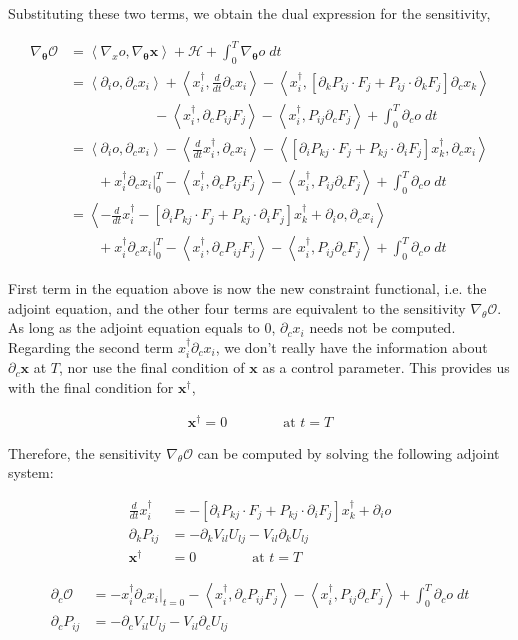 \documentclass[11pt]{article}
\def\Dnorm#1#2{ \frac{d #1 }{ d #2} }
\newcommand\eqsp[2]{
\begin{equation#1}
\begin{split}
#2
\end{split}
\end{equation#1}
}
\newcommand{\cH}{\mathcal{H}}
\newcommand{\cO}{\mathcal{O}}
\newcommand{\bx}{\mathbf{x}}
\newcommand{\bt}{\mathbf{\theta}}
\newcommand{\inprod}[2]{\left\langle #1,#2 \right\rangle}
\begin{document}
Substituting these two terms, we obtain the dual expression for the sensitivity,
\eqsp{*}{
\nabla_{\bt}\cO &= \inprod{\nabla_xo}{\nabla_{\bt}\bx} + \cH + \int_0^T \nabla_{\bt}o\;dt\\
&= \inprod{\partial_io}{\partial_cx_i}
+ \inprod{x_i^{\dagger}}{\Dnorm{}{t}\partial_cx_i}
- \inprod{x_i^{\dagger}}{\left[ \partial_kP_{ij}\cdot F_j + P_{ij}\cdot\partial_kF_j \right]\partial_cx_k}\\
&\qquad\qquad\qquad - \inprod{x_i^{\dagger}}{\partial_cP_{ij}F_j} - \inprod{x_i^{\dagger}}{P_{ij}\partial_cF_j} + \int_0^T \partial_co\;dt\\
&= \inprod{\partial_io}{\partial_cx_i}
- \inprod{\Dnorm{}{t}x_i^{\dagger}}{\partial_cx_i}
- \inprod{ \left[ \partial_iP_{kj}\cdot F_j + P_{kj}\cdot\partial_iF_j \right]x_k^{\dagger} }{ \partial_cx_i }\\
&\qquad +x_i^{\dagger}\partial_cx_i\bigg|_{0}^{T}
- \inprod{x_i^{\dagger}}{\partial_cP_{ij}F_j}
- \inprod{x_i^{\dagger}}{P_{ij}\partial_cF_j}
+ \int_0^T \partial_co\;dt\\
&= \inprod{-\Dnorm{}{t}x_i^{\dagger} - \left[ \partial_iP_{kj}\cdot F_j + P_{kj}\cdot\partial_iF_j \right]x_k^{\dagger} + \partial_io }{\partial_cx_i}\\
&\qquad +x_i^{\dagger}\partial_cx_i\bigg|_{0}^{T}
- \inprod{x_i^{\dagger}}{\partial_cP_{ij}F_j}
- \inprod{x_i^{\dagger}}{P_{ij}\partial_cF_j}
+ \int_0^T \partial_co\;dt
}
First term in the equation above is now the new constraint functional, i.e. the adjoint equation,
and the other four terms are equivalent to the sensitivity $\nabla_\theta\cO$.
As long as the adjoint equation equals to 0, $\partial_cx_i$ needs not be computed.
Regarding the second term $x_i^{\dagger}\partial_cx_i$,
we don't really have the information about $\partial_c\bx$ at $T$,
nor use the final condition of $\bx$ as a control parameter.
This provides us with the final condition for $\bx^{\dagger}$,
\eqsp{*}{
\bx^{\dagger} = 0\qquad\qquad \text{at }t=T
}
Therefore, the sensitivity $\nabla_\theta\cO$ can be computed by solving the following adjoint system:
\eqsp{*}{
\Dnorm{}{t}x_i^{\dagger} &= - \left[ \partial_iP_{kj}\cdot F_j + P_{kj}\cdot\partial_iF_j \right]x_k^{\dagger} + \partial_io\\
\partial_kP_{ij} &= -\partial_kV_{il}U_{lj} - V_{il}\partial_kU_{lj}\\
\bx^{\dagger} &= 0\qquad\qquad \text{at }t=T
}
\eqsp{*}{
\partial_c\cO &= - x_i^{\dagger}\partial_cx_i\bigg|_{t=0}
- \inprod{x_i^{\dagger}}{\partial_cP_{ij}F_j}
- \inprod{x_i^{\dagger}}{P_{ij}\partial_cF_j}
+ \int_0^T \partial_co\;dt\\
\partial_cP_{ij} &= -\partial_cV_{il}U_{lj} - V_{il}\partial_cU_{lj}
}
\end{document}
